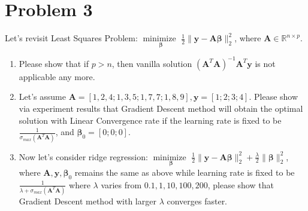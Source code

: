 \documentclass[11pt]{article}
\newcommand{\R}{\mathbb{R}}
\newcommand{\minimize}{\operatorname*{minimize\ }}
\newcommand{\mtx}[1]{\mathbf{#1}}
\newcommand{\vct}[1]{\mathbf{#1}}
\def \mA {\mtx{A}}
\def \vy {\vct{y}}
\def \R {\mathbb{R}}
\begin{document}
	\section{Problem 3}
	Let's revisit Least Squares Problem: $\minimize \limits_{\bm{\beta}} \frac{1}{2}\|\vy-\mA\bm{\beta}\|^2_2$, where $\mA\in\R^{n\times p}$.
	\begin{enumerate}
		\item Please show that if $p>n$, then vanilla solution $(\mA^T\mA)^{-1}\mA^T\vy$ is not applicable any more.	
		\item Let's assume $\mA=[1, 2, 4;1, 3, 5; 1, 7, 7; 1, 8, 9], \vy=[1;2;3;4]$. Please show via experiment results that Gradient Descent method will obtain the optimal solution with  Linear Convergence rate if the learning rate is fixed to be $\frac{1}{\sigma_{max}(\mA^T\mA)}$, and $\bm{\beta}_0=[0;0;0]$.	
		\item Now let's consider ridge regression: $\minimize \limits_{\bm{\beta}} \frac{1}{2}\|\vy-\mA\bm{\beta}\|^2_2+\frac{\lambda}{2} \|\bm{\beta}\|^2_2$, where  $\mA,\vy,\bm{\beta}_0$ remains the same as above while learning rate is fixed to be $\frac{1}{\lambda+\sigma_{max}(\mA^T\mA)}$ where $\lambda$ varies from $0.1,1,10,100,200$, please show that Gradient Descent method with larger $\lambda$ converges faster. 
	\end{enumerate}
\end{document}
